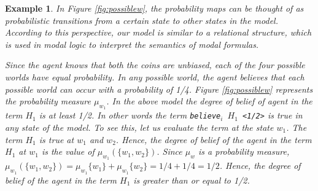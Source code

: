 \documentclass[12pt]{article}
\newtheorem{example}[theorem]{Example}
\begin{document}
\begin{example}
{In Figure \ref{fig:possiblew}, the probability maps can be thought of as probabilistic transitions from a certain state to other states in the model. According to this perspective, our model is similar to a relational structure, which is used in modal logic to interpret the semantics of modal formulas.

Since the agent knows that both the coins are unbiased, each of the four possible worlds have equal probability. In any possible world, the agent believes that each possible world can occur with a probability of 1/4. Figure \ref{fig:possiblew} represents the probability measure $\mu_{w_1}$. In the above model the degree of belief of agent in the term $H_1$ is at least 1/2. In other words the term \texttt{believe$_i$ $H_1$ <1/2>} is true in any state of the model. To see this, let us evaluate the term at the state $w_1$. The term $H_1$ is true at $w_1$ and $w_2$. Hence, the degree of belief of the agent in the term $H_1$ at $w_1$ is the value of $\mu_{w_1} (\{w_1,w_2\})$. Since $\mu_{w}$ is a probability measure, $\mu_{w_1} (\{w_1,w_2\})=\mu_{w_1}\{w_1\}+\mu_{w_1}\{w_2\} =1/4 + 1/4 =1/2$. Hence, the degree of belief of the agent in the term $H_1$ is greater than or equal to 1/2.      

}
\end{example}
\end{document}
